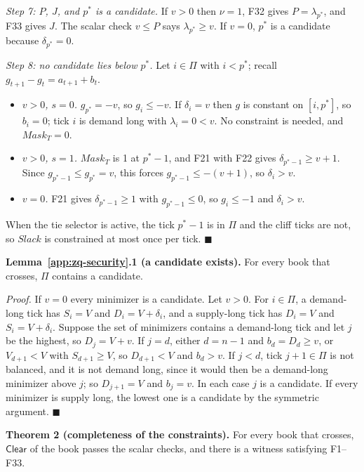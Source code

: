 \emph{Step 7: \(P\), \(J\), and \(p^*\) is a candidate.} If \(v > 0\) then \(\nu = 1\), F32 gives \(P = \lambda_{p^*}\), and F33 gives \(J\). The scalar check \(v \le P\) says \(\lambda_{p^*} \ge v\). If \(v = 0\), \(p^*\) is a candidate because \(\delta_{p^*} = 0\).

\emph{Step 8: no candidate lies below \(p^*\).} Let \(i \in \Pi\) with \(i < p^*\); recall \(g_{t+1} - g_t = a_{t+1} + b_t\).

\begin{itemize}
\item
  \emph{\(v > 0\), \(s = 0\).} \(g_{p^*} = -v\), so \(g_i \le -v\). If \(\delta_i = v\) then \(g\) is constant on \([i, p^*]\), so \(b_i = 0\); tick \(i\) is demand long with \(\lambda_i = 0 < v\). No constraint is needed, and \(Mask_T = 0\).
\item
  \emph{\(v > 0\), \(s = 1\).} \(Mask_T\) is 1 at \(p^* - 1\), and F21 with F22 gives \(\delta_{p^*-1} \ge v + 1\). Since \(g_{p^*-1} \le g_{p^*} = v\), this forces \(g_{p^*-1} \le -(v+1)\), so \(\delta_i > v\).
\item
  \emph{\(v = 0\).} F21 gives \(\delta_{p^*-1} \ge 1\) with \(g_{p^*-1} \le 0\), so \(g_i \le -1\) and \(\delta_i > v\).
\end{itemize}

When the tie selector is active, the tick \(p^* - 1\) is in \(\Pi\) and the cliff ticks are not, so \(Slack\) is constrained at most once per tick. \(\blacksquare\)

\textbf{Lemma~\ref{app:zq-security}.1 (a candidate exists).} For every book that crosses, \(\Pi\) contains a candidate.

\emph{Proof.} If \(v = 0\) every minimizer is a candidate. Let \(v > 0\). For \(i \in \Pi\), a demand-long tick has \(S_i = V\) and \(D_i = V + \delta_i\), and a supply-long tick has \(D_i = V\) and \(S_i = V + \delta_i\). Suppose the set of minimizers contains a demand-long tick and let \(j\) be the highest, so \(D_j = V + v\). If \(j = d\), either \(d = n - 1\) and \(b_d = D_d \ge v\), or \(V_{d+1} < V\) with \(S_{d+1} \ge V\), so \(D_{d+1} < V\) and \(b_d > v\). If \(j < d\), tick \(j + 1 \in \Pi\) is not balanced, and it is not demand long, since it would then be a demand-long minimizer above \(j\); so \(D_{j+1} = V\) and \(b_j = v\). In each case \(j\) is a candidate. If every minimizer is supply long, the lowest one is a candidate by the symmetric argument. \(\blacksquare\)

\textbf{Theorem 2 (completeness of the constraints).} For every book that crosses, \(\mathsf{Clear}\) of the book passes the scalar checks, and there is a witness satisfying F1--F33.

